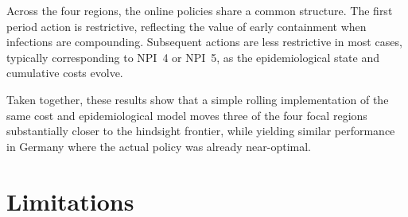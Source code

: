 \documentclass[msom,blindrev]{informs3} %
\begin{document}
{Across the four regions, the online policies share a common structure. The first period action is restrictive, reflecting the value of early containment when infections are compounding. Subsequent actions are less restrictive in most cases, typically corresponding to NPI~4 or NPI~5, as the epidemiological state and cumulative costs evolve.

Taken together, these results show that a simple rolling implementation of the same cost and epidemiological model moves three of the four focal regions substantially closer to the hindsight frontier, while yielding similar performance in Germany where the actual policy was already near-optimal.}

\section{Limitations}
\label{sec:limitations}
\end{document}
